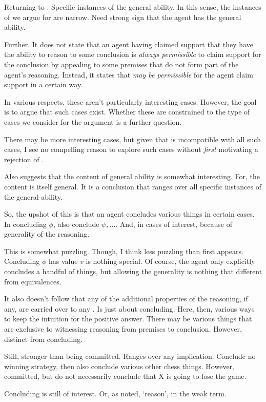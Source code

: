 \begin{note}
  Returning to \EAS{}.
  Specific instances of the general ability.
  In this sense, the instances of \EAS{} we argue for are narrow.
  Need strong sign that the agent has the general ability.

  Further.
  It does not state that an agent having claimed support that they have the ability to reason to some conclusion is \emph{always permissible} to claim support for the conclusion by appealing to some premises that do not form part of the agent's reasoning.
  Instead, it states that \emph{may be permissible} for the agent claim support in a certain way.

  In various respects, these aren't particularly interesting cases.
  However, the goal is to argue that such cases exist.
  Whether these are constrained to the type of cases we consider for the argument is a further question.

  There may be more interesting cases, but given that \ESU{} is incompatible with all such cases, I see no compelling reason to explore such cases without \emph{first} motivating a rejection of \ESU{}.
\end{note}

\begin{note}
  Also suggests that the content of general ability is somewhat interesting.
  For, the content is itself general.
  It is a conclusion that ranges over all specific instances of the general ability.
\end{note}

\begin{note}[Terminology]
  So, the upshot of this is that an agent concludes various things in certain cases.
  In concluding \(\phi\), also conclude \(\psi,\dots\).
  And, in cases of interest, because of generality of the reasoning.

  This is somewhat puzzling.
  Though, I think less puzzling than first appears.
  Concluding \(\phi\) has value \(v\) is nothing special.
  Of course, the agent only explicitly concludes a handful of things, but allowing the generality is nothing that different from equivalences.

  It also doesn't follow that any of the additional properties of the reasoning, if any, are carried over to any .
  Is just about concluding.
  Here, then, various ways to keep the intuition for the positive answer.
  There may be various things that are exclusive to witnessing reasoning from premises to conclusion.
  However, distinct from concluding.

  Still, stronger than being committed.
  Ranges over any implication.
  Conclude no winning strategy, then also conclude various other chess things.
  However, committed, but do not necessarily conclude that X is going to lose the game.

  Concluding is still of interest.
  Or, as noted, `reason', in the weak term.
\end{note}

